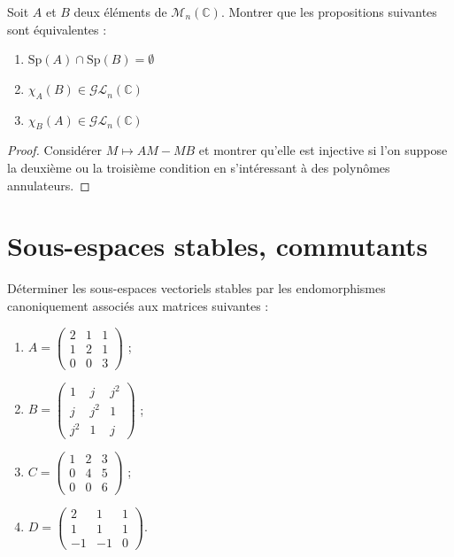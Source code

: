 \documentclass[french,a4paper]{article}
\newcommand{\C}{\mathbb{C}}
\theoremstyle{plain}
\theoremstyle{definition}
\theoremstyle{remark}
\begin{document}
\begin{ex}[Révisions]{}
	Soit $A$ et $B$ deux éléments de $\mathcal{M}_n(\C)$. Montrer que les propositions suivantes sont équivalentes :
	\begin{enumerate}[label=(\roman*)]
		\item $\text{Sp}(A)\cap\text{Sp}(B)=\emptyset$
		\item $\chi_A(B)\in\mathcal{GL}_n(\C)$
		\item $\chi_B(A)\in\mathcal{GL}_n(\C)$
	\end{enumerate}
\end{ex}
\begin{proof}
	Considérer $M\mapsto AM-MB$ et montrer qu'elle est injective si l'on suppose la deuxième ou la troisième condition en s'intéressant à des polynômes annulateurs.
\end{proof}

\section{Sous-espaces stables, commutants}

\begin{ex}{}
	Déterminer les sous-espaces vectoriels stables par les endomorphismes canoniquement associés aux matrices suivantes : 
	\begin{enumerate}
		\item $A=\displaystyle\begin{pmatrix}
			2&1&1\\
			1&2&1\\
			0&0&3
		\end{pmatrix}$ ;
		\item $B=\displaystyle\begin{pmatrix}
			1&j&j^2\\
			j&j^2&1\\
			j^2&1&j
		\end{pmatrix}$ ;
		\item $C=\displaystyle\begin{pmatrix}
			1&2&3\\
			0&4&5\\
			0&0&6
		\end{pmatrix}$ ;
		\item $D=\displaystyle\begin{pmatrix}
			2&1&1\\
			1&1&1\\
			-1&-1&0
		\end{pmatrix}$.
	\end{enumerate}
\end{ex}
\end{document}
